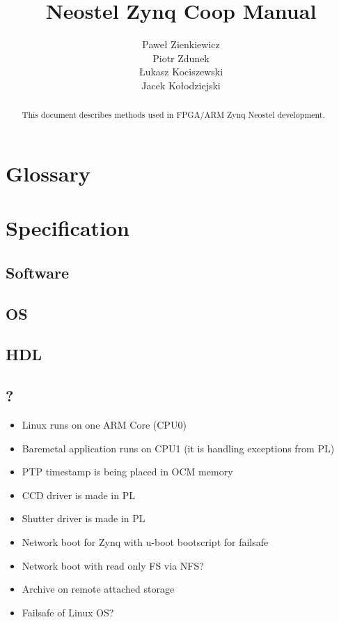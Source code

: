 \documentclass[twoside,a4paper]{refart}
\title{Neostel Zynq Coop Manual}
\author{Paweł Zienkiewicz\\
Piotr Zdunek \\
Łukasz Kociszewski \\
Jacek Kołodziejski}
\date{}
\begin{document}
%

\maketitle

\begin{abstract}
        This document describes methods used in FPGA/ARM Zynq Neostel development.
\end{abstract}

\tableofcontents

\newpage
\section{Glossary} 

\newpage
\section{Specification}
\subsection{Software}
\subsection{OS}

\cite{ART:MENTOR_OS}

\subsection{HDL}
\subsection{?}


\begin{itemize}
\item Linux runs on one ARM Core (CPU0) \cite{XilinxZynqWiki}
\item Baremetal application runs on CPU1 (it is handling exceptions from PL)
\item PTP timestamp is being placed in OCM memory
\item CCD driver is made in PL 
\item Shutter driver is made in PL
\item Network boot for Zynq with u-boot bootscript for failsafe \cite{TIWikiUBoot,UbootParsing}
\item Network boot with read only FS via NFS?
\item Archive on remote attached storage
\item Failsafe of Linux OS?
\end{itemize}
\end{document}
